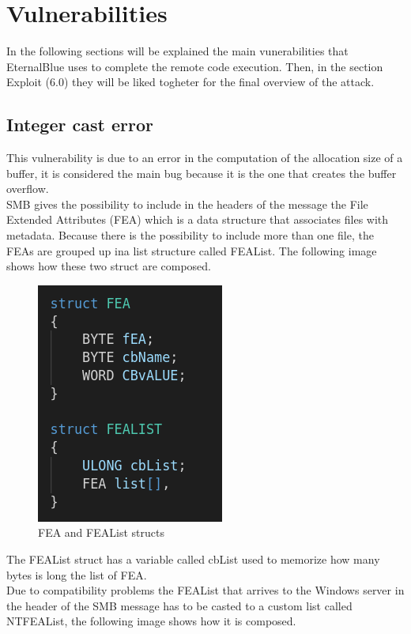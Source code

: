 \section{Vulnerabilities}
In the following sections will be explained the main vunerabilities that EternalBlue uses to complete the remote code execution. 
Then, in the section Exploit (6.0) they will be liked togheter for the final overview of the attack.

\subsection{Integer cast error}
This vulnerability is due to an error in the computation of the allocation size of a buffer, it is considered the main bug because it is the one that creates the buffer overflow.\\
SMB gives the possibility to include in the headers of the message the File Extended Attributes (FEA) which is a data structure that 
associates files with metadata. Because there is the possibility to include more than one file, the FEAs are grouped up ina list structure called FEAList.
The following image shows how these two struct are composed.

\begin{figure}[ht!]
  \centering
    \includegraphics[scale=0.5]{images/FEA_code.png}
    \caption{FEA and FEAList structs}
\end{figure}
\noindent The FEAList struct has a variable called cbList used to memorize how many bytes is long the list of FEA.\\
Due to compatibility problems the FEAList that arrives to the Windows server in the header of the SMB message has to be casted to 
a custom list called NTFEAList, the following image shows how it is composed.

